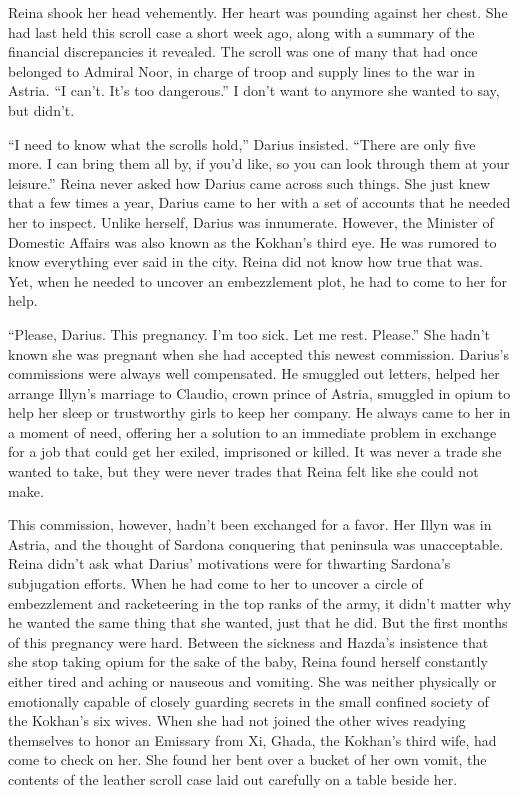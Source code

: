 \documentclass{article}
\begin{document}
	Reina shook her head vehemently. Her heart was pounding against her chest. She had last held this scroll case a short week ago, along with a summary of the financial discrepancies it revealed. The scroll was one of many that had once belonged to Admiral Noor, in charge of troop and supply lines to the war in Astria. “I can’t. It’s too dangerous.” I don’t want to anymore she wanted to say, but didn’t.
	
	“I need to know what the scrolls hold,” Darius insisted. “There are only five more. I can bring them all by, if you’d like, so you can look through them at your leisure.” Reina never asked how Darius came across such things. She just knew that a few times a year, Darius came to her with a set of accounts that he needed her to inspect. Unlike herself, Darius was innumerate. However, the Minister of Domestic Affairs was also known as the Kokhan’s third eye. He was rumored to know everything ever said in the city. Reina did not know how true that was. Yet, when he needed to uncover an embezzlement plot, he had to come to her for help. 
	
	“Please, Darius. This pregnancy. I’m too sick. Let me rest. Please.” She hadn’t known she was pregnant when she had accepted this newest commission. Darius’s commissions were always well compensated. He smuggled out letters, helped her arrange Illyn’s marriage to Claudio, crown prince of Astria, smuggled in opium to help her sleep or trustworthy girls to keep her company. He always came to her in a moment of need, offering her a solution to an immediate problem in exchange for a job that could get her exiled, imprisoned or killed. It was never a trade she wanted to take, but they were never trades that Reina felt like she could not make.
	
	This commission, however, hadn’t been exchanged for a favor. Her Illyn was in Astria, and the thought of Sardona conquering that peninsula was unacceptable. Reina didn’t ask what Darius’ motivations were for thwarting Sardona’s subjugation efforts. When he had come to her to uncover a circle of embezzlement and racketeering in the top ranks of the army, it didn’t matter why he wanted the same thing that she wanted, just that he did. But the first months of this pregnancy were hard. Between the sickness and Hazda’s insistence that she stop taking opium for the sake of the baby, Reina found herself constantly either tired and aching or nauseous and vomiting. She was neither physically or emotionally capable of closely guarding secrets in the small confined society of the Kokhan’s six wives. When she had not joined the other wives readying themselves to honor an Emissary from Xi, Ghada, the Kokhan’s third wife, had come to check on her. She found her bent over a bucket of her own vomit, the contents of the leather scroll case laid out carefully on a table beside her. 
	
\end{document}
